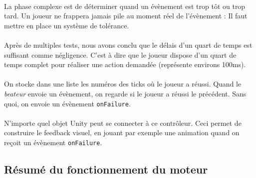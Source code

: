 \paragraph{}

La phase complexe est de déterminer quand un évènement est trop tôt ou trop tard. Un joueur ne frappera jamais pile au moment réel de l'évènement : Il faut mettre en place un système de tolérance.
\\\\
Après de multiples tests, nous avons conclu que le délais d'un quart de temps est suffisant comme négligence. C'est à dire que le joueur dispose d'un quart de temps complet pour réaliser une action demandée (représente environs 100ms).
\\\\
On stocke dans une liste les numéros des ticks où le joueur a réussi. Quand le \textit{beateur} envoie un évènement, on regarde si le joueur a réussi le précédent. Sans quoi, on envoie un évènement \texttt{onFailure}.
\\\\
N'importe quel objet Unity peut se connecter à ce contrôleur. Ceci permet de construire le feedback visuel, en jouant par exemple une animation quand on reçoit un évènement \texttt{onFailure}.

\subsection{Résumé du fonctionnement du moteur}
\label{engine_summary}
\noindent
{}
\paragraph{}

